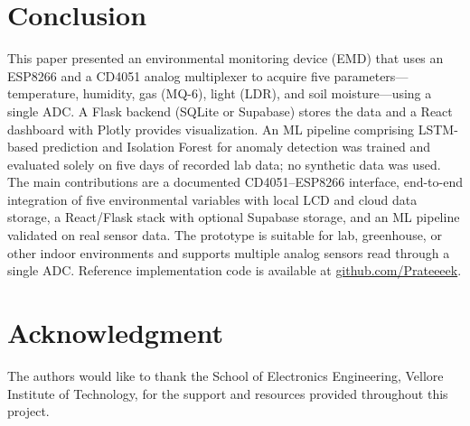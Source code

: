 \documentclass[journal,onecolumn]{IEEEtran}
\begin{document}
\clearpage
\section{Conclusion}
This paper presented an environmental monitoring device (EMD) that uses an ESP8266 and a CD4051 analog multiplexer to acquire five parameters—temperature, humidity, gas (MQ-6), light (LDR), and soil moisture—using a single ADC. A Flask backend (SQLite or Supabase) stores the data and a React dashboard with Plotly provides visualization. An ML pipeline comprising LSTM-based prediction and Isolation Forest for anomaly detection was trained and evaluated solely on five days of recorded lab data; no synthetic data was used. The main contributions are a documented CD4051--ESP8266 interface, end-to-end integration of five environmental variables with local LCD and cloud data storage, a React/Flask stack with optional Supabase storage, and an ML pipeline validated on real sensor data. The prototype is suitable for lab, greenhouse, or other indoor environments and supports multiple analog sensors read through a single ADC. Reference implementation code is available at \href{https://github.com/Prateeeek}{github.com/Prateeeek}.
\section*{Acknowledgment}
The authors would like to thank the School of Electronics Engineering, Vellore Institute of Technology, for the support and resources provided throughout this project.
\end{document}
